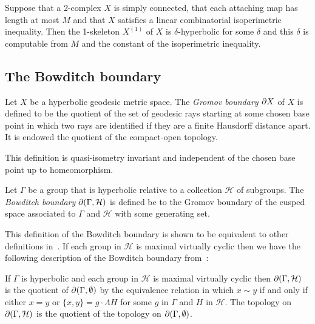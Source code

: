 \begin{prop}\cite[Prop.\ 2.23]{grovesmanning08}\label{prop:linearimplieshyperbolic}
Suppose that a 2-complex $X$ is simply connected, that each attaching map has
length at most $M$ and that $X$ satisfies a linear combinatorial
isoperimetric inequality. Then the 1-skeleton $X^{(1)}$ of $X$ is
$\delta$-hyperbolic for some $\delta$ and this $\delta$ is computable from
$M$ and the constant of the isoperimetric inequality. \end{prop}

\subsection{The Bowditch boundary}

\begin{defn}\label{defn:gromovboundary} Let $X$ be a hyperbolic geodesic metric
space. The \emph{Gromov boundary $\partial X$} of $X$ is defined to be the
quotient of the set of geodesic rays starting at some chosen base point in
which two rays are identified if they are a finite Hausdorff distance apart.
It is endowed the quotient of the compact-open topology.\end{defn}

This definition is quasi-isometry invariant and independent of the chosen base
point up to homeomorphism. 

\begin{defn}\label{defn:bowditchboundary} Let $\Gamma$ be a group that is hyperbolic
relative to a collection $\mathcal{H}$ of subgroups. The \emph{Bowditch
boundary} $\partial(\Gamma, \mathcal{H})$ is defined be to the Gromov boundary
of the cusped space associated to $\Gamma$ and $\mathcal{H}$ with some
generating set.\end{defn}

This definition of the Bowditch boundary is shown to be equivalent to other
definitions in~\cite{bowditch12}. If each group in $\mathcal{H}$ is maximal
virtually cyclic then we have the following description of the Bowditch
boundary from~\cite{manning15}:

\begin{lem}\label{lem:bowditchfromgromov} If $\Gamma$ is hyperbolic and each
group in $\mathcal{H}$ is maximal virtually cyclic then $\partial(\Gamma,
\mathcal{H})$ is the quotient of $\partial(\Gamma, \emptyset)$ by the
equivalence relation in which $x \sim y$ if and only if either $x = y$ or
$\{x, y\} = g\cdot\Lambda H$ for some $g$ in $\Gamma$ and $H$ in $\mathcal{H}$.
The topology on $\partial (\Gamma, \mathcal{H})$ is the quotient of the
topology on $\partial(\Gamma, \emptyset)$.
\end{lem}

